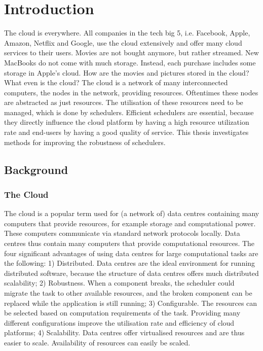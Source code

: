 \chapter{Introduction}\label{sec:intro}

\setcounter{page}{1}

The cloud is everywhere. All companies in the tech big 5, i.e. Facebook,
Apple, Amazon, Netflix and Google, use the cloud extensively and offer many
cloud services to their users. Movies are not bought anymore, but rather
streamed. New MacBooks do not come with much storage. Instead, each purchase
includes some storage in Apple's cloud. How are the movies and pictures stored
in the cloud? What even is the cloud? The cloud is a network of many
interconnected computers, the nodes in the network, providing resources.
Oftentimes these nodes are abstracted as just resources. The utilisation of
these resources need to be managed, which is done by schedulers. Efficient
schedulers are essential, because they directly influence the cloud platform by
having a high resource utilization rate and end-users by having a good quality
of service. This thesis investigates methods for improving the robustness of
schedulers.


\section{Background}
\subsection{The Cloud}\label{sec:cloud}

The cloud is a popular term used for (a network of) data centres containing
many computers that provide resources, for example storage and computational
power. These computers communicate via standard network protocols locally.
Data centres thus contain many computers that provide computational resources.
The four significant advantages of using data centres for large computational
tasks are the following: 1) Distributed. Data centres are the ideal
environment for running distributed software, because the structure of data
centres offers much distributed scalability; 2) Robustness. When a component
breaks, the scheduler could migrate the task to other available resources, and
the broken component can be replaced while the application is still running;
3) Configurable. The resources can be selected based on computation
requirements of the task. Providing many different configurations improve the
utilisation rate and efficiency of cloud platforms; 4) Scalability. Data centres
offer virtualised resources and are thus easier to scale. Availability of
resources can easily be scaled.

